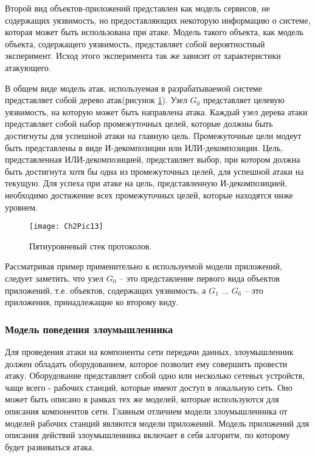     Второй вид объектов-приложений представлен как модель сервисов, не содержащих уязвимость, но предоставляющих некоторую информацию о системе, которая может быть использована при атаке. Модель такого объекта, как модель объекта, содержащего уязвимость, представляет собой вероятностный эксперимент. Исход этого эксперимента так же зависит от характеристики атакующего.

    В общем виде модель атак, используемая в разрабатываемой системе представляет собой дерево атак(рисунок \ref{Pic13}). Узел $G_{0}$ представляет целевую уязвимость, на которую может быть направлена атака. Каждый узел дерева атаки представляет собой набор промежуточных целей, которые должны быть достигнуты для успешной атаки на главную цель. Промежуточные цели модеут быть представлены в виде И-декомпозиции или ИЛИ-декомпозиции. Цель, представленная ИЛИ-декомпозицией, представляет выбор, при котором должна быть достигнута хотя бы одна из промежуточных целей, для успешной атаки на текущую. Для успеха при атаке на цель, представленную И-декомпозицией, необходимо достижение всех промежуточных целей, которые находятся ниже уровнем.

    \begin{figure}\center
        \texttt{[image: Ch2Pic13]}
        \caption{Пятиуровневый стек протоколов.} \label{Pic13}
    \end{figure}

    Рассматривая пример применительно к используемой модели приложений, следует заметить, что узел $G_{0}$ -- это представление первого вида объектов приложений, т.е. объектов, содержащих уязвимость, а $G_{1}$ ... $G_{6}$ -- это приложения, принадлежащие ко второму виду.

    \subsubsection{Модель поведения злоумышленника}

    Для проведения атаки на компоненты сети передачи данных, злоумышленник должен обладать оборудованием, которое позволит ему совершить провести атаку. Оборудование представляет собой одно или несколько сетевых устройств, чаще всего - рабочих станций, которые имеют доступ в локальную сеть. Оно может быть описано в рамках тех же моделей, которые используются для описания компонентов сети. Главным отличием модели злоумышленника от моделей рабочих станций являются модели приложений. Модель приложений для описания действий злоумышленника включает в себя алгоритм, по которому будет развиваться атака.


